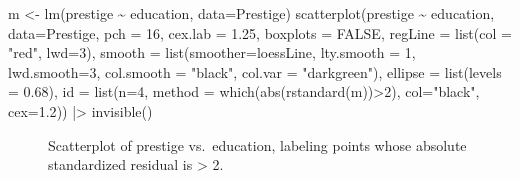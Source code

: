 \documentclass[
  letterpaper,
  10pt,
  krantz2]{krantz}
\makeatletter
\newenvironment{Shaded}{\begin{snugshade}}{\end{snugshade}}
\newcommand{\AttributeTok}[1]{\textcolor[rgb]{0.40,0.45,0.13}{#1}}
\newcommand{\ConstantTok}[1]{\textcolor[rgb]{0.56,0.35,0.01}{#1}}
\newcommand{\DecValTok}[1]{\textcolor[rgb]{0.68,0.00,0.00}{#1}}
\newcommand{\FloatTok}[1]{\textcolor[rgb]{0.68,0.00,0.00}{#1}}
\newcommand{\FunctionTok}[1]{\textcolor[rgb]{0.28,0.35,0.67}{#1}}
\newcommand{\NormalTok}[1]{\textcolor[rgb]{0.00,0.23,0.31}{#1}}
\newcommand{\OtherTok}[1]{\textcolor[rgb]{0.00,0.23,0.31}{#1}}
\newcommand{\SpecialCharTok}[1]{\textcolor[rgb]{0.37,0.37,0.37}{#1}}
\newcommand{\StringTok}[1]{\textcolor[rgb]{0.13,0.47,0.30}{#1}}
\newenvironment{kframe}{%
  \medskip{}
  \setlength{\fboxsep}{.8em}
  \def\at@end@of@kframe{}%
  \ifinner\ifhmode%
  \def\at@end@of@kframe{\end{minipage}}%
  \begin{minipage}{\columnwidth}%
  \fi\fi%
  \def\FrameCommand##1{\hskip\@totalleftmargin \hskip-\fboxsep
  \colorbox{shadecolor}{##1}\hskip-\fboxsep
      \hskip-\linewidth \hskip-\@totalleftmargin \hskip\columnwidth}%
  \MakeFramed {\advance\hsize-\width
    \@totalleftmargin\z@ \linewidth\hsize
    \@setminipage}}%
{\par\unskip\endMakeFramed%
  \at@end@of@kframe}
\renewenvironment{Shaded}{\begin{kframe}}{\end{kframe}}
\makeatother
\begin{document}
\begin{Shaded}
\begin{Highlighting}[]
\NormalTok{m }\OtherTok{\textless{}{-}} \FunctionTok{lm}\NormalTok{(prestige }\SpecialCharTok{\textasciitilde{}}\NormalTok{ education, }\AttributeTok{data=}\NormalTok{Prestige)}
\FunctionTok{scatterplot}\NormalTok{(prestige }\SpecialCharTok{\textasciitilde{}}\NormalTok{ education, }\AttributeTok{data=}\NormalTok{Prestige,}
            \AttributeTok{pch =} \DecValTok{16}\NormalTok{, }\AttributeTok{cex.lab =} \FloatTok{1.25}\NormalTok{,}
            \AttributeTok{boxplots =} \ConstantTok{FALSE}\NormalTok{,}
            \AttributeTok{regLine =} \FunctionTok{list}\NormalTok{(}\AttributeTok{col =} \StringTok{"red"}\NormalTok{, }\AttributeTok{lwd=}\DecValTok{3}\NormalTok{),}
            \AttributeTok{smooth =} \FunctionTok{list}\NormalTok{(}\AttributeTok{smoother=}\NormalTok{loessLine,}
                          \AttributeTok{lty.smooth =} \DecValTok{1}\NormalTok{, }\AttributeTok{lwd.smooth=}\DecValTok{3}\NormalTok{,}
                          \AttributeTok{col.smooth =} \StringTok{"black"}\NormalTok{, }
                          \AttributeTok{col.var =} \StringTok{"darkgreen"}\NormalTok{),}
            \AttributeTok{ellipse =} \FunctionTok{list}\NormalTok{(}\AttributeTok{levels =} \FloatTok{0.68}\NormalTok{),}
            \AttributeTok{id =} \FunctionTok{list}\NormalTok{(}\AttributeTok{n=}\DecValTok{4}\NormalTok{, }\AttributeTok{method =} \FunctionTok{which}\NormalTok{(}\FunctionTok{abs}\NormalTok{(}\FunctionTok{rstandard}\NormalTok{(m))}\SpecialCharTok{\textgreater{}}\DecValTok{2}\NormalTok{), }
                      \AttributeTok{col=}\StringTok{"black"}\NormalTok{, }\AttributeTok{cex=}\FloatTok{1.2}\NormalTok{)) }\SpecialCharTok{|\textgreater{}} \FunctionTok{invisible}\NormalTok{()}
\end{Highlighting}
\end{Shaded}

\begin{figure}


\caption{\label{fig-Prestige-scatterplot-educ2}Scatterplot of prestige
vs.~education, labeling points whose absolute standardized residual is
\textgreater{} 2.}

\end{figure}%
\end{document}
